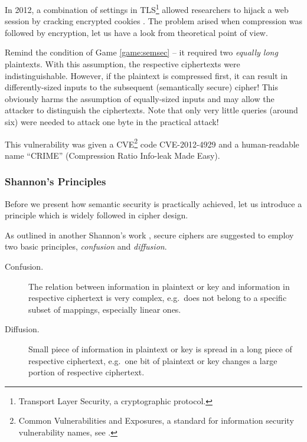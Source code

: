 \begin{example}
\label{ex:crime}
	In 2012, a combination of settings in TLS\footnote{Transport Layer Security, a cryptographic protocol.} allowed researchers to hijack a web session by cracking encrypted cookies \cite{goodin2012crime}. The problem arised when compression was followed by encryption, let us have a look from theoretical point of view.
	
	Remind the condition of Game \ref{game:semsec} -- it required two {\em equally long} plaintexts. With this assumption, the respective ciphertexts were indistinguishable. However, if the plaintext is compressed first, it can result in differently-sized inputs to the subsequent (semantically secure) cipher! This obviously harms the assumption of equally-sized inputs and may allow the attacker to distinguish the ciphertexts. Note that only very little queries (around six) were needed to attack one byte in the practical attack!
	
	This vulnerability was given a CVE\footnote{Common Vulnerabilities and Exposures, a standard for information security vulnerability names, see .} code CVE-2012-4929 and a human-readable name ``CRIME'' (Compression Ratio Info-leak Made Easy).
\end{example}

\subsubsection{Shannon's Principles}
	
	Before we present how semantic security is practically achieved, let us introduce a principle which is widely followed in cipher design.
	
	\begin{princ}[Shannon]
		As outlined in another Shannon's work \cite{shannon1949communication}, secure ciphers are suggested to employ two basic principles, {\em confusion} and {\em diffusion}.
		\begin{description}
			\item[Confusion.] The relation between information in plaintext or key and information in respective ciphertext is very complex, e.g.\ does not belong to a specific subset of mappings, especially linear ones.
			\item[Diffusion.] Small piece of information in plaintext or key is spread in a long piece of respective ciphertext, e.g.\ one bit of plaintext or key changes a large portion of respective ciphertext.
		\end{description}
	\end{princ}
	

